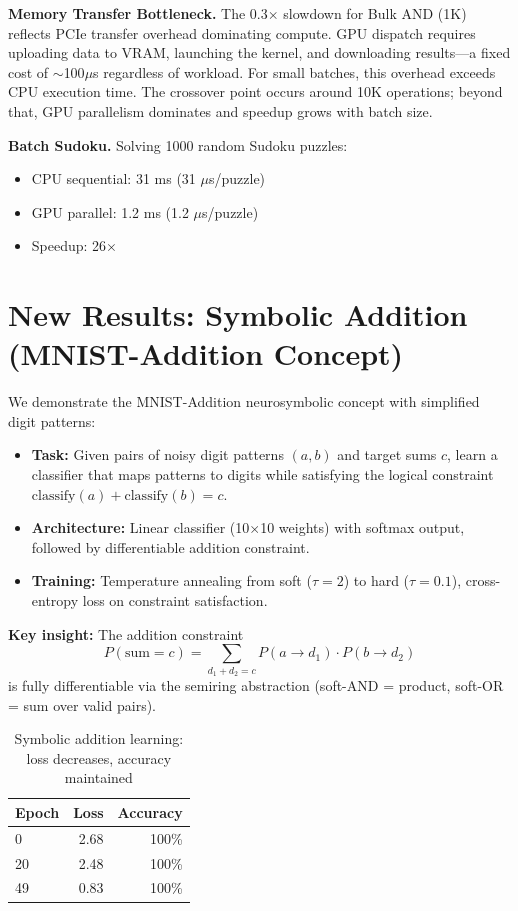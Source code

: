 \documentclass[11pt,a4paper]{article}
\begin{document}
\textbf{Memory Transfer Bottleneck.}
The 0.3$\times$ slowdown for Bulk AND (1K) reflects PCIe transfer overhead dominating compute.
GPU dispatch requires uploading data to VRAM, launching the kernel, and downloading results---a fixed cost of $\sim$100$\mu$s regardless of workload.
For small batches, this overhead exceeds CPU execution time.
The crossover point occurs around 10K operations; beyond that, GPU parallelism dominates and speedup grows with batch size.

\textbf{Batch Sudoku.}
Solving 1000 random Sudoku puzzles:
\begin{itemize}
  \item CPU sequential: 31 ms (31 $\mu$s/puzzle)
  \item GPU parallel: 1.2 ms (1.2 $\mu$s/puzzle)
  \item Speedup: 26$\times$
\end{itemize}

\section{New Results: Symbolic Addition (MNIST-Addition Concept)}

We demonstrate the MNIST-Addition neurosymbolic concept with simplified digit patterns:

\begin{itemize}
  \item \textbf{Task:} Given pairs of noisy digit patterns $(a, b)$ and target sums $c$, learn a classifier that maps patterns to digits while satisfying the logical constraint $\text{classify}(a) + \text{classify}(b) = c$.
  \item \textbf{Architecture:} Linear classifier (10$\times$10 weights) with softmax output, followed by differentiable addition constraint.
  \item \textbf{Training:} Temperature annealing from soft ($\tau=2$) to hard ($\tau=0.1$), cross-entropy loss on constraint satisfaction.
\end{itemize}

\textbf{Key insight:} The addition constraint
\[
P(\text{sum} = c) = \sum_{d_1 + d_2 = c} P(a \to d_1) \cdot P(b \to d_2)
\]
is fully differentiable via the semiring abstraction (soft-AND = product, soft-OR = sum over valid pairs).

\begin{table}[H]
\centering
\begin{tabular}{lrr}
\toprule
\textbf{Epoch} & \textbf{Loss} & \textbf{Accuracy} \\
\midrule
0 & 2.68 & 100\% \\
20 & 2.48 & 100\% \\
49 & 0.83 & 100\% \\
\bottomrule
\end{tabular}
\caption{Symbolic addition learning: loss decreases, accuracy maintained}
\label{tab:symbolic_addition}
\end{table}
\end{document}
